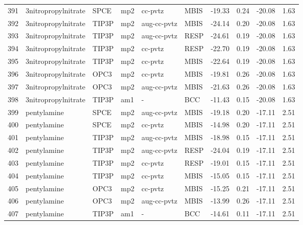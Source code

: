 \begin{tabular}{llllllrrrr}
391 &            3nitropropylnitrate &       SPCE &      mp2 &      cc-pvtz &         MBIS & -19.33 &      0.24 &      -20.08 &     1.63 \\
392 &            3nitropropylnitrate &      TIP3P &      mp2 &  aug-cc-pvtz &         MBIS & -24.14 &      0.20 &      -20.08 &     1.63 \\
393 &            3nitropropylnitrate &      TIP3P &      mp2 &  aug-cc-pvtz &         RESP & -24.61 &      0.19 &      -20.08 &     1.63 \\
394 &            3nitropropylnitrate &      TIP3P &      mp2 &      cc-pvtz &         RESP & -22.70 &      0.19 &      -20.08 &     1.63 \\
395 &            3nitropropylnitrate &      TIP3P &      mp2 &      cc-pvtz &         MBIS & -22.64 &      0.19 &      -20.08 &     1.63 \\
396 &            3nitropropylnitrate &       OPC3 &      mp2 &      cc-pvtz &         MBIS & -19.81 &      0.26 &      -20.08 &     1.63 \\
397 &            3nitropropylnitrate &       OPC3 &      mp2 &  aug-cc-pvtz &         MBIS & -21.63 &      0.26 &      -20.08 &     1.63 \\
398 &            3nitropropylnitrate &      TIP3P &      am1 &            - &          BCC & -11.43 &      0.15 &      -20.08 &     1.63 \\
399 &                    pentylamine &       SPCE &      mp2 &  aug-cc-pvtz &         MBIS & -19.18 &      0.20 &      -17.11 &     2.51 \\
400 &                    pentylamine &       SPCE &      mp2 &      cc-pvtz &         MBIS & -14.98 &      0.20 &      -17.11 &     2.51 \\
401 &                    pentylamine &      TIP3P &      mp2 &  aug-cc-pvtz &         MBIS & -18.98 &      0.15 &      -17.11 &     2.51 \\
402 &                    pentylamine &      TIP3P &      mp2 &  aug-cc-pvtz &         RESP & -24.04 &      0.19 &      -17.11 &     2.51 \\
403 &                    pentylamine &      TIP3P &      mp2 &      cc-pvtz &         RESP & -19.01 &      0.15 &      -17.11 &     2.51 \\
404 &                    pentylamine &      TIP3P &      mp2 &      cc-pvtz &         MBIS & -15.05 &      0.15 &      -17.11 &     2.51 \\
405 &                    pentylamine &       OPC3 &      mp2 &      cc-pvtz &         MBIS & -15.25 &      0.21 &      -17.11 &     2.51 \\
406 &                    pentylamine &       OPC3 &      mp2 &  aug-cc-pvtz &         MBIS & -13.99 &      0.26 &      -17.11 &     2.51 \\
407 &                    pentylamine &      TIP3P &      am1 &            - &          BCC & -14.61 &      0.11 &      -17.11 &     2.51 \\
\bottomrule
\end{tabular}
